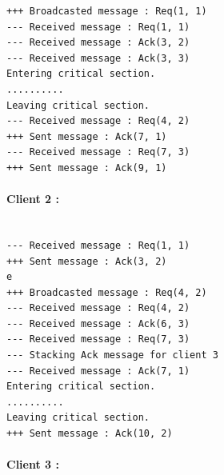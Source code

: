         \begin{minipage}{0.90\textwidth}
                \begin{lstlisting}
+++ Broadcasted message : Req(1, 1)
--- Received message : Req(1, 1)
--- Received message : Ack(3, 2)
--- Received message : Ack(3, 3)
Entering critical section.
..........
Leaving critical section.
--- Received message : Req(4, 2)
+++ Sent message : Ack(7, 1)
--- Received message : Req(7, 3)
+++ Sent message : Ack(9, 1)
                \end{lstlisting}
        \end{minipage}


\paragraph{Client 2 :\\}

        \begin{minipage}{0.90\textwidth}
                \begin{lstlisting}

--- Received message : Req(1, 1)
+++ Sent message : Ack(3, 2)
e
+++ Broadcasted message : Req(4, 2)
--- Received message : Req(4, 2)
--- Received message : Ack(6, 3)
--- Received message : Req(7, 3)
--- Stacking Ack message for client 3
--- Received message : Ack(7, 1)
Entering critical section.
..........
Leaving critical section.
+++ Sent message : Ack(10, 2)
\end{lstlisting}
        \end{minipage}

\paragraph{Client 3 :\\ }

